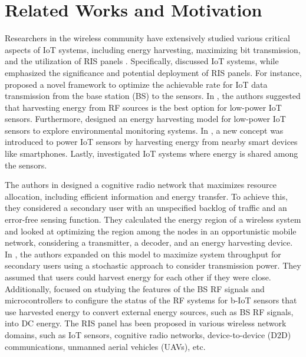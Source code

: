 \section{Related Works and Motivation}
Researchers in the wireless community have extensively studied various critical aspects of IoT systems, including energy harvesting, maximizing bit transmission, and the utilization of RIS panels \cite{Ref_RW_1,Ref_RW_2,Ref_RW_3,Ref_RW_5,Ref_RW_6,Ref_RW_9,Ref_RW_11,Ref_RIS14, Ref_RW_13,Ref_RW_14,Ref_RW_15,Ref_RW_1..,Ref_RW_17,Ref_RW_18,Ref_RW_20,Ref_RW_7,Ref_RW_8,Ref_RW_19}. Specifically, \cite{Ref_RW_1,Ref_RW_2,Ref_RW_3,Ref_RW_5,Ref_RW_6,Ref_RW_9,Ref_RW_11,Ref_RIS14} discussed IoT systems, while \cite{Ref_RW_13,Ref_RW_14,Ref_RW_15,Ref_RW_1..,Ref_RW_17,Ref_RW_18,Ref_RW_20,Ref_RW_7,Ref_RW_8,Ref_RW_19} emphasized the significance and potential deployment of RIS panels.
For instance, \cite{Ref_RW_1} proposed a novel framework to optimize the achievable rate for IoT data transmission from the base station (BS) to the sensors. In \cite{Ref_RW_2}, the authors suggested that harvesting energy from RF sources is the best option for low-power IoT sensors. Furthermore, \cite{Ref_RW_3} designed an energy harvesting model for low-power IoT sensors to explore environmental monitoring systems. In \cite{Ref_RW_5}, a new concept was introduced to power IoT sensors by harvesting energy from nearby smart devices like smartphones. Lastly, \cite{Ref_RW_6} investigated IoT systems where energy is shared among the sensors.


The authors in \cite{Ref_RW_9} designed a cognitive radio network that maximizes resource allocation, including efficient information and energy transfer. To achieve this, they considered a secondary user with an unspecified backlog of traffic and an error-free sensing function. They calculated the energy region of a wireless system and looked at optimizing the region among the nodes in an opportunistic mobile network, considering a transmitter, a decoder, and an energy harvesting device. In \cite{Ref_RW_11}, the authors expanded on this model to maximize system throughput for secondary users using a stochastic approach to consider transmission power. They assumed that users could harvest energy for each other if they were close. Additionally, \cite{Ref_RIS14} focused on studying the features of the BS RF signals and microcontrollers to configure the status of the RF systems for b-IoT sensors that use harvested energy to convert external energy sources, such as BS RF signals, into DC energy.
The RIS panel has been proposed in various wireless network domains, such as IoT sensors, cognitive radio networks, device-to-device (D2D) communications, unmanned aerial vehicles (UAVs), etc.

